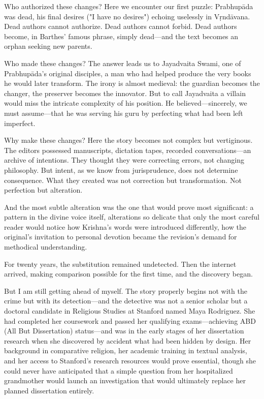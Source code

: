 \documentclass[12pt,twoside]{book}
\begin{document}
Who authorized these changes? Here we encounter our first puzzle: Prabhupāda was dead, his final desires ("I have no desires") echoing uselessly in Vṛndāvana. Dead authors cannot authorize. Dead authors cannot forbid. Dead authors become, in Barthes' famous phrase, simply dead—and the text becomes an orphan seeking new parents.

Who made these changes? The answer leads us to Jayadvaita Swami, one of Prabhupāda's original disciples, a man who had helped produce the very books he would later transform. The irony is almost medieval: the guardian becomes the changer, the preserver becomes the innovator. But to call Jayadvaita a villain would miss the intricate complexity of his position. He believed—sincerely, we must assume—that he was serving his guru by perfecting what had been left imperfect.

Why make these changes? Here the story becomes not complex but vertiginous. The editors possessed manuscripts, dictation tapes, recorded conversations—an archive of intentions. They thought they were correcting errors, not changing philosophy. But intent, as we know from jurisprudence, does not determine consequence. What they created was not correction but transformation. Not perfection but alteration.

And the most subtle alteration was the one that would prove most significant: a pattern in the divine voice itself, alterations so delicate that only the most careful reader would notice how Krishna's words were introduced differently, how the original's invitation to personal devotion became the revision's demand for methodical understanding.

For twenty years, the substitution remained undetected. Then the internet arrived, making comparison possible for the first time, and the discovery began.

But I am still getting ahead of myself. The story properly begins not with the crime but with its detection—and the detective was not a senior scholar but a doctoral candidate in Religious Studies at Stanford named Maya Rodriguez. She had completed her coursework and passed her qualifying exams—achieving ABD (All But Dissertation) status—and was in the early stages of her dissertation research when she discovered by accident what had been hidden by design. Her background in comparative religion, her academic training in textual analysis, and her access to Stanford's research resources would prove essential, though she could never have anticipated that a simple question from her hospitalized grandmother would launch an investigation that would ultimately replace her planned dissertation entirely.
\end{document}
